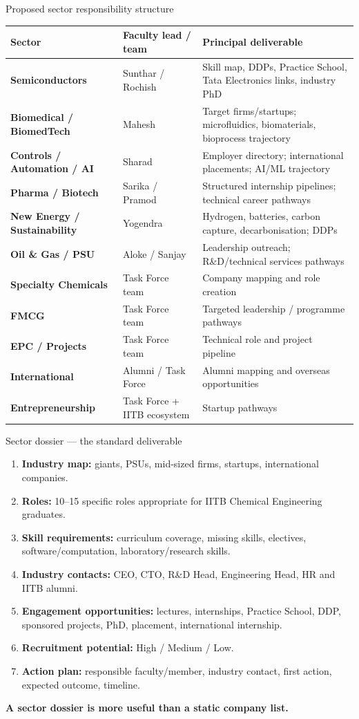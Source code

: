 \documentclass[aspectratio=169,11pt]{beamer}
\newcommand{\key}[1]{\textbf{\color{IITblue}#1}}
\begin{document}
\begin{frame}{Proposed sector responsibility structure}
\scriptsize
\begin{tabularx}{\textwidth}{>{\bfseries}p{4.0cm} p{3.2cm} X}
\toprule
Sector & Faculty lead / team & Principal deliverable \\
\midrule
Semiconductors & Sunthar / Rochish & Skill map, DDPs, Practice School, Tata Electronics links, industry PhD \\
Biomedical / BiomedTech & Mahesh & Target firms/startups; microfluidics, biomaterials, bioprocess trajectory \\
Controls / Automation / AI & Sharad & Employer directory; international placements; AI/ML trajectory \\
Pharma / Biotech & Sarika / Pramod & Structured internship pipelines; technical career pathways \\
New Energy / Sustainability & Yogendra & Hydrogen, batteries, carbon capture, decarbonisation; DDPs \\
Oil \& Gas / PSU & Aloke / Sanjay & Leadership outreach; R\&D/technical services pathways \\
Specialty Chemicals & Task Force team & Company mapping and role creation \\
FMCG & Task Force team & Targeted leadership / programme pathways \\
EPC / Projects & Task Force team & Technical role and project pipeline \\
International & Alumni / Task Force & Alumni mapping and overseas opportunities \\
Entrepreneurship & Task Force + IITB ecosystem & Startup pathways \\
\bottomrule
\end{tabularx}
\end{frame}

\begin{frame}{Sector dossier — the standard deliverable}
\begin{enumerate}
\item \key{Industry map:} giants, PSUs, mid-sized firms, startups, international companies.
\item \key{Roles:} 10--15 specific roles appropriate for IITB Chemical Engineering graduates.
\item \key{Skill requirements:} curriculum coverage, missing skills, electives, software/computation, laboratory/research skills.
\item \key{Industry contacts:} CEO, CTO, R\&D Head, Engineering Head, HR and IITB alumni.
\item \key{Engagement opportunities:} lectures, internships, Practice School, DDP, sponsored projects, PhD, placement, international internship.
\item \key{Recruitment potential:} High / Medium / Low.
\item \key{Action plan:} responsible faculty/member, industry contact, first action, expected outcome, timeline.
\end{enumerate}
\vspace{3mm}
\centering\key{A sector dossier is more useful than a static company list.}
\end{frame}
\end{document}
